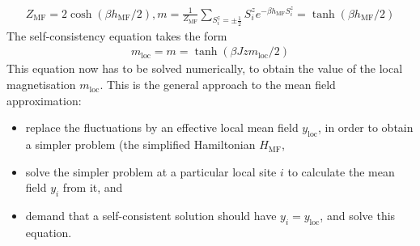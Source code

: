 \documentclass{article}
\begin{document}
\begin{equation}\begin{aligned}
	Z_\text{MF} = 2\cosh \left(\beta h_\text{MF}/2\right), m = \frac{1}{Z_\text{MF}}\sum_{S_i^z = \pm \frac{1}{2}} S_i^z e^{-\beta h_\text{MF}S_i^z} = \tanh \left(\beta h_\text{MF}/2\right)
\end{aligned}\end{equation}
The self-consistency equation takes the form
\begin{equation}\begin{aligned}
	m_\text{loc} = m = \tanh \left(\beta Jzm_\text{loc}/2\right)
\end{aligned}\end{equation}
This equation now has to be solved numerically, to obtain the value of the local magnetisation \(m_\text{loc}\). This is the general approach to the mean field approximation: 
\begin{itemize}
	\item replace the fluctuations by an effective local mean field \(y_\text{loc}\), in order to obtain a simpler problem (the simplified Hamiltonian \(H_\text{MF}\),
	\item solve the simpler problem at a particular local site \(i\) to calculate the mean field \(y_i\) from it, and
	\item demand that a self-consistent solution should have \(y_i = y_\text{loc}\), and solve this equation.
\end{itemize}
\end{document}

